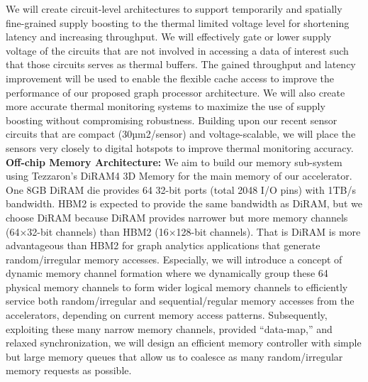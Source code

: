 We will create circuit-level architectures to support temporarily and spatially fine-grained supply boosting to the thermal limited voltage level for shortening latency and increasing throughput. We will effectively gate or lower supply voltage of the circuits that are not involved in accessing a data of interest such that those circuits serves as thermal buffers. The gained throughput and latency improvement will be used to enable the flexible cache access to improve the performance of our proposed graph processor architecture. We will also create more accurate thermal monitoring systems to maximize the use of supply boosting without compromising robustness. Building upon our recent sensor circuits that are compact (30µm2/sensor) and voltage-scalable, we will place the sensors very closely to digital hotspots to improve thermal monitoring accuracy.
\noindent
\textbf{Off-chip Memory Architecture:} 
We aim to build our memory sub-system using Tezzaron’s DiRAM4 3D Memory for the main memory of our accelerator. 
One 8GB DiRAM die provides 64 32-bit ports (total 2048 I/O pins) with 1TB/s bandwidth. 
HBM2 is expected to provide the same bandwidth as DiRAM, but we choose DiRAM because DiRAM provides narrower but more memory channels (64×32-bit channels) than HBM2 (16×128-bit channels). 
That is DiRAM is more advantageous than HBM2 for graph analytics applications that generate random/irregular memory accesses. 
Especially, we will introduce a concept of dynamic memory channel formation where we dynamically group these 64 physical memory channels to form wider logical memory channels to efficiently service both random/irregular and sequential/regular memory accesses from the accelerators, depending on current memory access patterns. 
Subsequently, exploiting these many narrow memory channels, provided ``data-map,'' and relaxed synchronization, we will design an efficient memory controller with simple but large memory queues that allow us to coalesce as many random/irregular memory requests as possible.
